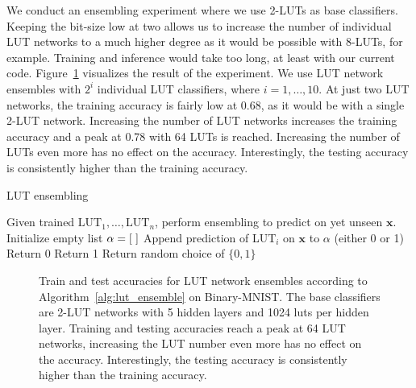 We conduct an ensembling experiment where we use 2-LUTs as base classifiers. Keeping the bit-size low at two allows us to increase the number of individual LUT networks to a much higher degree as it would be possible with 8-LUTs, for example. Training and inference would take too long, at least with our current code. Figure~\ref{fig:plain_lut_ensembling} visualizes the result of the experiment. We use LUT network ensembles with $2^i$ individual LUT classifiers, where $i = 1, \dots, 10$. At just two LUT networks, the training accuracy is fairly low at 0.68, as it would be with a single 2-LUT network. Increasing the number of LUT networks increases the training accuracy and a peak at 0.78 with 64 LUTs is reached. Increasing the number of LUTs even more has no effect on the accuracy. Interestingly, the testing accuracy is consistently higher than the training accuracy.

\begin{algorithm}
  \caption{LUT ensembling}
  \label{alg:lut_ensemble}
  \begin{algorithmic}
    \State Given trained $\text{LUT}_1, \dots, \text{LUT}_n$, perform ensembling to predict on yet unseen $\bm{x}$.
    \vspace{1em}
    \State Initialize empty list $\alpha = [\hspace{0.3em}]$
      \State Append prediction of LUT$_i$ on $\bm{x}$ to $\alpha$ (either 0 or 1)
    \EndFor
      \State Return 0
      \State Return 1
    \Else
      \State Return random choice of $\{0, 1\}$
    \EndIf
  \end{algorithmic}
\end{algorithm}
\FloatBarrier

\begin{figure}[!htb]
    \centering
    
    \caption{Train and test accuracies for LUT network ensembles according to Algorithm~\ref{alg:lut_ensemble} on Binary-MNIST. The base classifiers are 2-LUT networks with 5 hidden layers and 1024 luts per hidden layer. Training and testing accuracies reach a peak at 64 LUT networks, increasing the LUT number even more has no effect on the accuracy. Interestingly, the testing accuracy is consistently higher than the training accuracy.}
\label{fig:plain_lut_ensembling}
\end{figure}
\FloatBarrier

